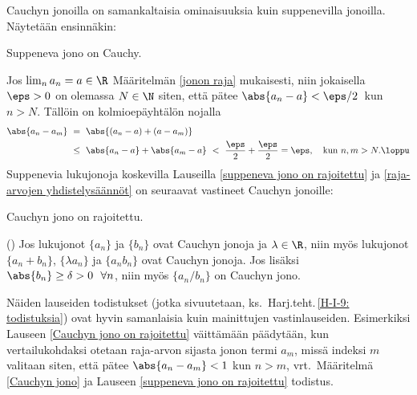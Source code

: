 Cauchyn jonoilla on samankaltaisia ominaisuuksia kuin suppenevilla jonoilla. Näytetään
ensinnäkin:
\begin{Lause} \label{suppeneva jono on Cauchy} Suppeneva jono on Cauchy. \end{Lause}
\tod Jos $\lim_na_n=a\in\R$ Määritelmän \ref{jonon raja} mukaisesti, niin jokaisella $\eps>0$
on olemassa $N\in\N$ siten, että pätee $\abs{a_n - a} < \eps/2\,$ kun $n>N$. Tällöin on
kolmioepäyhtälön nojalla
\begin{align*}
\abs{a_n - a_m}\ &=\ \abs{(a_n - a) + (a - a_m)} \\
                 &\le\ \abs{a_n-a}+\abs{a_m-a}\ <\ \frac{\eps}{2} + \frac{\eps}{2} = \eps, 
                                                   \quad \text{kun}\ n,m > N. \loppu 
\end{align*}%
Suppenevia lukujonoja koskevilla Lauseilla \ref{suppeneva jono on rajoitettu} ja 
\ref{raja-arvojen yhdistelysäännöt} on seuraavat vastineet Cauchyn jonoille:
\begin{Lause} \label{Cauchyn jono on rajoitettu} Cauchyn jono on rajoitettu.
\end{Lause}
\begin{Lause} \label{Cauchyn jonojen yhdistelysäännöt} 
 ()
Jos lukujonot $\{a_n\}$ ja $\{b_n\}$ ovat Cauchyn jonoja ja $\lambda\in\R$, niin myös lukujonot
$\{a_n + b_n\}$, $\{\lambda a_n\}$ ja $\{a_n b_n\}$ ovat Cauchyn jonoja. Jos lisäksi 
$\abs{b_n} \ge \delta > 0\ \ \forall n$, niin myös $\{a_n/b_n\}$ on Cauchyn jono.
\end{Lause}
Näiden lauseiden todistukset (jotka sivuutetaan, ks.\ Harj.teht.\,\ref{H-I-9: todistuksia})
ovat hyvin samanlaisia kuin mainittujen vastinlauseiden. Esimerkiksi Lauseen 
\ref{Cauchyn jono on rajoitettu} väittämään päädytään, kun vertailukohdaksi otetaan raja-arvon
sijasta jonon termi $a_m$, missä indeksi $m$ valitaan siten, että pätee 
$\abs{a_n - a_m} < 1$ kun $n>m$, vrt.\ Määritelmä \ref{Cauchyn jono} ja Lauseen 
\ref{suppeneva jono on rajoitettu} todistus.

